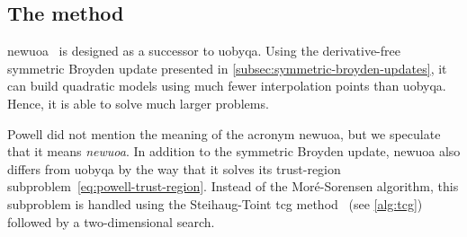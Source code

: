 \subsection{The  method}
\label{subsec:newuoa}

\Gls{newuoa}~\cite{Powell_2006} is designed as a successor to \gls{uobyqa}.
Using the derivative-free symmetric Broyden update presented in \cref{subsec:symmetric-broyden-updates}, it can build quadratic models using much fewer interpolation points than \gls{uobyqa}.
Hence, it is able to solve much larger problems.

Powell did not mention the meaning of the acronym \gls{newuoa}, but we speculate that it means \emph{\glsdesc{newuoa}}.
In addition to the symmetric Broyden update, \gls{newuoa} also differs from \gls{uobyqa} by the way that it solves its trust-region subproblem~\cref{eq:powell-trust-region}.
Instead of the Mor{\'{e}}-Sorensen algorithm, this subproblem is handled using the Steihaug-Toint \gls{tcg} method~\cite{Steihaug_1983,Toint_1981} (see \cref{alg:tcg}) followed by a two-dimensional search.

